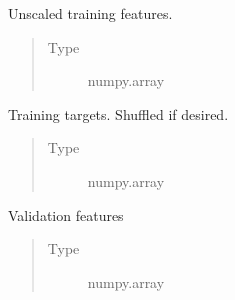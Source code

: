 \documentclass[a4paper,10pt,english]{sphinxmanual}
\begin{document}
\begin{fulllineitems}
\begin{fulllineitems}
\begin{quote}
\begin{description}
\end{description}\end{quote}

\end{fulllineitems}


\begin{fulllineitems}
\label{\detokenize{api/ucf.TrainingDataSets:ucf.TrainingDataSets.train_features}}
Unscaled training features.
\begin{quote}\begin{description}
\item[{Type}] \leavevmode
numpy.array

\end{description}\end{quote}

\end{fulllineitems}


\begin{fulllineitems}
\label{\detokenize{api/ucf.TrainingDataSets:ucf.TrainingDataSets.train_targets}}
Training targets. Shuffled if desired.
\begin{quote}\begin{description}
\item[{Type}] \leavevmode
numpy.array

\end{description}\end{quote}

\end{fulllineitems}


\begin{fulllineitems}
\label{\detokenize{api/ucf.TrainingDataSets:ucf.TrainingDataSets.validation_features}}
Validation features
\begin{quote}\begin{description}
\item[{Type}] \leavevmode
numpy.array


\end{description}
\end{quote}
\end{fulllineitems}
\end{fulllineitems}
\end{document}
